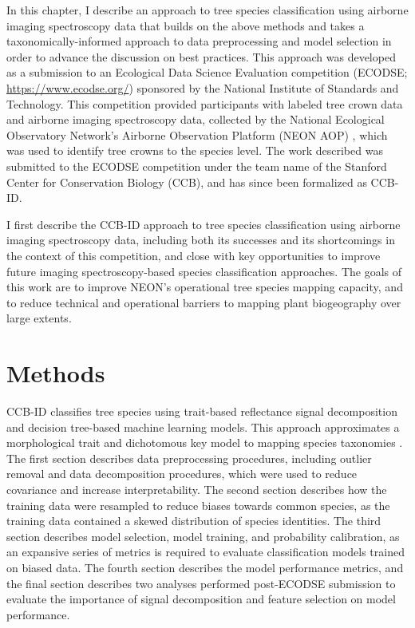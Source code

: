 In this chapter, I describe an approach to tree species classification using airborne imaging spectroscopy data that builds on the above methods and takes a taxonomically-informed approach to data preprocessing and model selection in order to advance the discussion on best practices. This approach was developed as a submission to an Ecological Data Science Evaluation competition (ECODSE; \url{https://www.ecodse.org/}) sponsored by the National Institute of Standards and Technology. This competition provided participants with labeled tree crown data and airborne imaging spectroscopy data, collected by the National Ecological Observatory Network’s Airborne Observation Platform (NEON AOP) \cite{Kampe2010-fz}, which was used to identify tree crowns to the species level. The work described was submitted to the ECODSE competition under the team name of the Stanford Center for Conservation Biology (CCB), and has since been formalized as CCB-ID.

I first describe the CCB-ID approach to tree species classification using airborne imaging spectroscopy data, including both its successes and its shortcomings in the context of this competition, and close with key opportunities to improve future imaging spectroscopy-based species classification approaches. The goals of this work are to improve NEON’s operational tree species mapping capacity, and to reduce technical and operational barriers to mapping plant biogeography over large extents.

\section{Methods}

CCB-ID classifies tree species using trait-based reflectance signal decomposition and decision tree-based machine learning models. This approach approximates a morphological trait and dichotomous key model to mapping species taxonomies \cite{Godfray2007-rl}. The first section describes data preprocessing procedures, including outlier removal and data decomposition procedures, which were used to reduce covariance and increase interpretability. The second section describes how the training data were resampled to reduce biases towards common species, as the training data contained a skewed distribution of species identities. The third section describes model selection, model training, and probability calibration, as an expansive series of metrics is required to evaluate classification models trained on biased data. The fourth section describes the model performance metrics, and the final section describes two analyses performed post-ECODSE submission to evaluate the importance of signal decomposition and feature selection on model performance.

